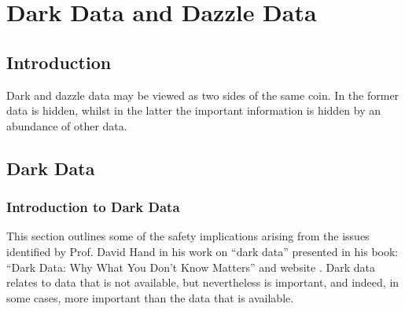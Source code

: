 %
%
\chapter{Dark Data and Dazzle Data}%
\label{bkm:darkdazzledata}
%

\section{Introduction}
Dark and dazzle data may be viewed as two sides of the same coin. In the former data is hidden, whilst in the latter the important \gls{information} is hidden by an abundance of other data.

\section{Dark Data}%
%
\label{bkm:darkdata}
%
\subsection{Introduction to Dark Data}
This section outlines some of the safety implications arising from the issues identified by Prof. David Hand in his work on ``dark data'' presented in his book: ``Dark Data: Why What You Don't Know Matters'' \cite{citation:darkdata:hand} and website \cite{citation:darkdata:website}. Dark data relates to data that is not available, but nevertheless is important, and indeed, in some cases, more important than the data that is available.

